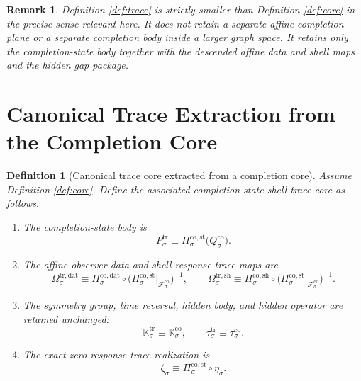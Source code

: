 \documentclass[11pt]{article}
\newcommand{\CoreAffine}[1]{\mathcal F_{#1}^{\mathrm{co}}}
\newcommand{\CoreBody}[1]{Q_{#1}^{\mathrm{co}}}
\newcommand{\CoreStateProj}[1]{\Pi_{#1}^{\mathrm{co,st}}}
\newcommand{\CoreDataProj}[1]{\Pi_{#1}^{\mathrm{co,dat}}}
\newcommand{\CoreShellProj}[1]{\Pi_{#1}^{\mathrm{co,sh}}}
\newcommand{\CoreSym}[1]{\mathbb K_{#1}^{\mathrm{co}}}
\newcommand{\CoreTime}[1]{\tau_{#1}^{\mathrm{co}}}
\newcommand{\CoreEmbed}[1]{\eta_{#1}}
\newcommand{\TraceBody}[1]{P_{#1}^{\mathrm{tr}}}
\newcommand{\TraceDataMap}[1]{\Omega_{#1}^{\mathrm{tr,dat}}}
\newcommand{\TraceShellMap}[1]{\Omega_{#1}^{\mathrm{tr,sh}}}
\newcommand{\TraceSym}[1]{\mathbb K_{#1}^{\mathrm{tr}}}
\newcommand{\TraceTime}[1]{\tau_{#1}^{\mathrm{tr}}}
\newcommand{\TraceEmbed}[1]{\zeta_{#1}}
\newtheorem{definition}{Definition}
\newtheorem{remark}{Remark}
\begin{document}
\begin{remark}
Definition \ref{def:trace} is strictly smaller than Definition \ref{def:core} in the precise sense relevant here. It does not retain a separate affine completion plane or a separate completion body inside a larger graph space. It retains only the completion-state body together with the descended affine data and shell maps and the hidden gap package.
\end{remark}

\section{Canonical Trace Extraction from the Completion Core}

\begin{definition}[Canonical trace core extracted from a completion core]
\label{def:extract}
Assume Definition \ref{def:core}. Define the associated completion-state shell-trace core as follows.
\begin{enumerate}
    \item The completion-state body is
    \begin{equation}
    \TraceBody{\sigma}
    \equiv
    \CoreStateProj{\sigma}\bigl(\CoreBody{\sigma}\bigr).
    \label{eq:tracebody}
    \end{equation}
    \item The affine observer-data and shell-response trace maps are
    \begin{equation}
    \TraceDataMap{\sigma}
    \equiv
    \CoreDataProj{\sigma}\circ
    \bigl(
    \CoreStateProj{\sigma}\big|_{\CoreAffine{\sigma}}
    \bigr)^{-1},
    \qquad
    \TraceShellMap{\sigma}
    \equiv
    \CoreShellProj{\sigma}\circ
    \bigl(
    \CoreStateProj{\sigma}\big|_{\CoreAffine{\sigma}}
    \bigr)^{-1}.
    \label{eq:tracemaps}
    \end{equation}
    \item The symmetry group, time reversal, hidden body, and hidden operator are retained unchanged:
    \[
    \TraceSym{\sigma}\equiv\CoreSym{\sigma},
    \qquad
    \TraceTime{\sigma}\equiv\CoreTime{\sigma}.
    \]
    \item The exact zero-response trace realization is
    \begin{equation}
    \TraceEmbed{\sigma}
    \equiv
    \CoreStateProj{\sigma}\circ\CoreEmbed{\sigma}.
    \label{eq:traceembed}
    \end{equation}
\end{enumerate}
\end{definition}
\end{document}
